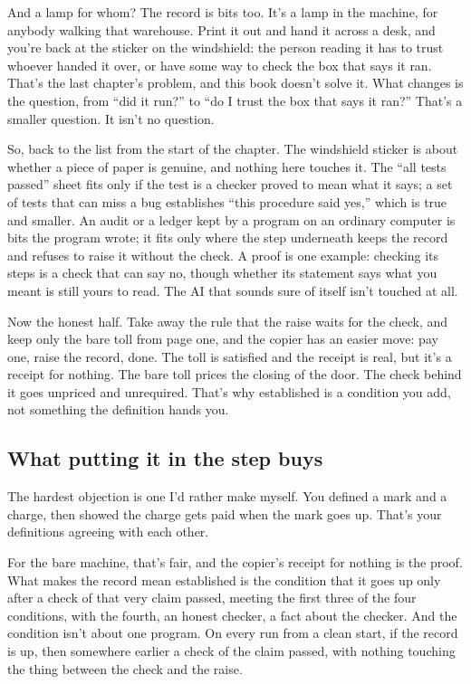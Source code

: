 \documentclass[11pt,twoside]{article}
\theoremstyle{thielethm}
\theoremstyle{thieledef}
\theoremstyle{thieledef}
\theoremstyle{thieledef}
\theoremstyle{thielethm}
\theoremstyle{thieleobs}
\theoremstyle{thielethm}
\begin{document}
And a lamp for whom? The record is bits too. It's a lamp in the machine, for anybody walking that warehouse. Print it out and hand it across a desk, and you're back at the sticker on the windshield: the person reading it has to trust whoever handed it over, or have some way to check the box that says it ran. That's the last chapter's problem, and this book doesn't solve it. What changes is the question, from ``did it run?'' to ``do I trust the box that says it ran?'' That's a smaller question. It isn't no question.

So, back to the list from the start of the chapter. The windshield sticker is about whether a piece of paper is genuine, and nothing here touches it. The ``all tests passed'' sheet fits only if the test is a checker proved to mean what it says; a set of tests that can miss a bug establishes ``this procedure said yes,'' which is true and smaller. An audit or a ledger kept by a program on an ordinary computer is bits the program wrote; it fits only where the step underneath keeps the record and refuses to raise it without the check. A proof is one example: checking its steps is a check that can say no, though whether its statement says what you meant is still yours to read. The AI that sounds sure of itself isn't touched at all.

Now the honest half. Take away the rule that the raise waits for the check, and keep only the bare toll from page one, and the copier has an easier move: pay one, raise the record, done. The toll is satisfied and the receipt is real, but it's a receipt for nothing. The bare toll prices the closing of the door. The check behind it goes unpriced and unrequired. That's why established is a condition you add, not something the definition hands you.

\subsection{What putting it in the step buys}

The hardest objection is one I'd rather make myself. You defined a mark and a charge, then showed the charge gets paid when the mark goes up. That's your definitions agreeing with each other.

For the bare machine, that's fair, and the copier's receipt for nothing is the proof. What makes the record mean established is the condition that it goes up only after a check of that very claim passed, meeting the first three of the four conditions, with the fourth, an honest checker, a fact about the checker. And the condition isn't about one program. On every run from a clean start, if the record is up, then somewhere earlier a check of the claim passed, with nothing touching the thing between the check and the raise.
\end{document}
